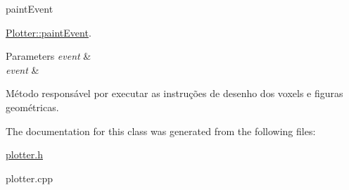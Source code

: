 paint\+Event 

\mbox{\hyperlink{classPlotter_a06477bf987646f000a8982db1352a11d}{Plotter\+::paint\+Event}}.


\begin{DoxyParams}{Parameters}
{\em event} & \\
\hline
{\em event} & \\
\hline
\end{DoxyParams}
Método responsável por executar as instruções de desenho dos voxels e figuras geométricas. 

The documentation for this class was generated from the following files\+:\begin{DoxyCompactItemize}
\item 
\mbox{\hyperlink{plotter_8h}{plotter.\+h}}\item 
plotter.\+cpp\end{DoxyCompactItemize}

